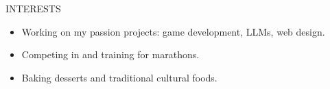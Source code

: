 
\begin{ResumeSection}{INTERESTS}
    \begin{itemize}
        \item Working on my passion projects: game development, LLMs, web design.
        \vspace{-0.5em}
        \item Competing in and training for marathons.
        \vspace{-0.5em}
        \item Baking desserts and traditional cultural foods.
    \end{itemize} 
\end{ResumeSection}
